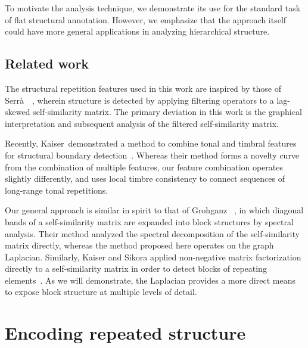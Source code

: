 \documentclass{article}
\begin{document}
To motivate the analysis technique, we demonstrate its use for the
standard task of flat structural annotation.  However, we emphasize that the approach
itself could have more general applications in analyzing hierarchical structure.

\subsection{Related work}

The structural repetition features used in this work are inspired by those of
Serr\`{a}~\etal~\cite{serra2012unsupervised}, wherein structure is detected by 
applying filtering operators to a lag-skewed self-similarity matrix.  The primary
deviation in this work is the graphical interpretation and subsequent analysis of 
the filtered self-similarity matrix.

Recently, Kaiser~\etal demonstrated a method to combine tonal and timbral features for
structural boundary detection~\cite{kaiser2013simple}.  Whereas their method forms a
novelty curve from the combination of multiple features, our feature combination
operates slightly differently, and uses local timbre consistency to connect sequences
of long-range tonal repetitions.

Our general approach is similar in spirit to that of Grohganz 
\etal~\cite{grohganz2013converting}, in which diagonal bands 
of a self-similarity matrix are expanded into block structures by 
spectral analysis.  Their method analyzed the spectral decomposition of the 
self-similarity matrix directly, whereas the method proposed here operates on the
graph Laplacian.  Similarly, Kaiser and Sikora applied non-negative matrix
factorization directly to a self-similarity matrix in order to detect blocks of
repeating elements~\cite{kaiser2010music}.  
As we will demonstrate, the Laplacian provides a more direct means to
expose block structure at multiple levels of detail.

\section{Encoding repeated structure}
\end{document}
